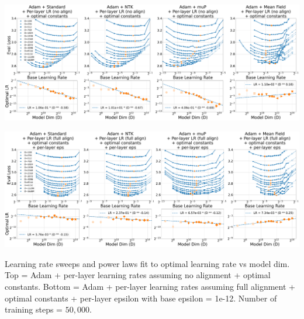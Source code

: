 \documentclass{article}
\theoremstyle{plain}
\theoremstyle{definition}
\theoremstyle{remark}
\begin{document}
\thispagestyle{plain}
\begin{SidewaysFigure}
\includegraphics[width=\linewidth]{icml2024/figures/lr_sweeps/appendix/adam/adam+50k_steps_per_module_lr_optimal_constants_no_align.pdf}

\figvspace

\includegraphics[width=\linewidth]{icml2024/figures/lr_sweeps/appendix/adam/adam+50k_steps_per_module_lr_optimal_constants_per_module_eps_base_eps12.pdf}
\caption{Learning rate sweeps and power laws fit to optimal learning rate vs model dim. Top = Adam + per-layer learning rates assuming no alignment + optimal constants. Bottom = Adam + per-layer learning rates assuming full alignment + optimal constants + per-layer epsilon with base epsilon = 1e-12. Number of training steps = $50{,}000$.}
\end{SidewaysFigure}
\clearpage
\end{document}
